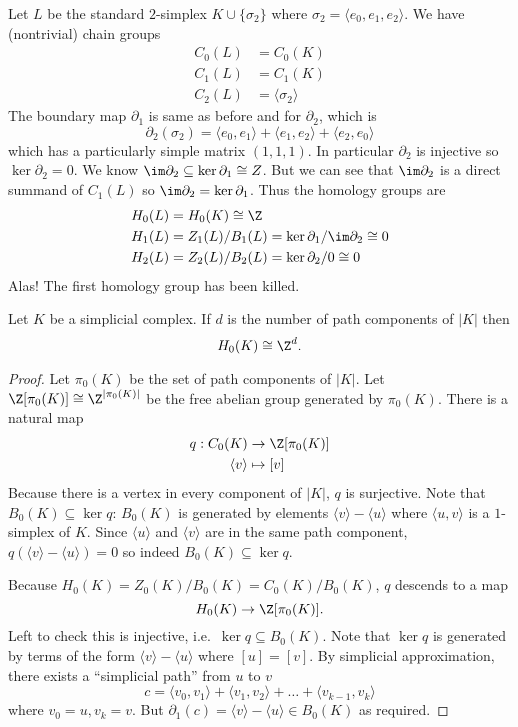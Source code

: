 \documentclass[a4paper]{article}
\renewcommand{\b}{\partial} %
\begin{document}
\begin{eg}
  Let \(L\) be the standard \(2\)-simplex \(K \cup \{\sigma_2\}\) where \(\sigma_2 = \langle e_0, e_1, e_2 \rangle\). We have (nontrivial) chain groups
  \begin{align*}
    C_0(L) &= C_0(K) \\
    C_1(L) &= C_1(K) \\
    C_2(L) &= \langle \sigma_2 \rangle
  \end{align*}
  The boundary map \(\b_1\) is same as before and for \(\b_2\), which is
  \[
    \b_2(\sigma_2) = \langle e_0, e_1 \rangle + \langle e_1, e_2 \rangle + \langle e_2, e_0 \rangle
  \]
  which has a particularly simple matrix \((1, 1, 1)\). In particular \(\b_2\) is injective so \(\ker \b_2 = 0\). We know \(\im \b_2 \subseteq \ker \b_1 \cong Z\). But we can see that \(\im \b_2\) is a direct summand of \(C_1(L)\) so \(\im \b_2 = \ker \b_1\). Thus the homology groups are
  \begin{align*}
    H_0(L) &= H_0(K) \cong \Z \\
    H_1(L) &= Z_1(L)/B_1(L) = \ker \b_1/\im \b_2 \cong 0 \\
    H_2(L) &= Z_2(L)/B_2(L) = \ker \b_2/0 \cong 0
  \end{align*}
  Alas! The first homology group has been killed.
\end{eg}

\begin{lemma}
  Let \(K\) be a simplicial complex. If \(d\) is the number of path components of \(|K|\) then
  \[
    H_0(K) \cong \Z^d.
  \]
\end{lemma}

\begin{proof}
  Let \(\pi_0(K)\) be the set of path components of \(|K|\). Let \(\Z[\pi_0(K)] \cong \Z^{|\pi_0(K)|}\) be the free abelian group generated by \(\pi_0(K)\). There is a natural map
  \begin{align*}
    q: C_0(K) &\to \Z[\pi_0(K)] \\
    \langle v\rangle &\mapsto [v]
  \end{align*}
  Because there is a vertex in every component of \(|K|\), \(q\) is surjective. Note that \(B_0(K) \subseteq \ker q\): \(B_0(K)\) is generated by elements \(\langle v \rangle - \langle u \rangle\) where \(\langle u, v \rangle\) is a \(1\)-simplex of \(K\). Since \(\langle u\rangle\) and \(\langle v\rangle\) are in the same path component, \(q(\langle v \rangle - \langle u\rangle) = 0\) so indeed \(B_0(K) \subseteq \ker q\).

  Because \(H_0(K) = Z_0(K)/B_0(K) = C_0(K)/B_0(K)\), \(q\) descends to a map
  \[
    H_0(K) \to \Z[\pi_0(K)].
  \]
  Left to check this is injective, i.e.\ \(\ker q \subseteq B_0(K)\). Note that \(\ker q\) is generated by terms of the form \(\langle v \rangle - \langle u\rangle\) where \([u] = [v]\). By simplicial approximation, there exists a ``simplicial path'' from \(u\) to \(v\)
  \[
    c = \langle v_0, v_1 \rangle + \langle v_1, v_2 \rangle + \dots + \langle v_{k - 1}, v_k\rangle
  \]
  where \(v_0 = u, v_k = v\). But \(\b_1(c) = \langle v \rangle - \langle u \rangle \in B_0(K)\) as required.
\end{proof}
\end{document}
